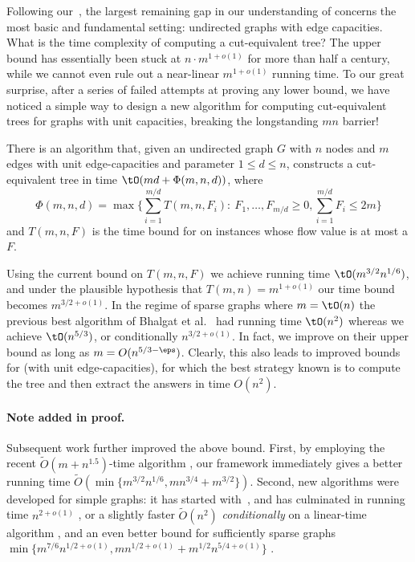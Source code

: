 \medskip

Following our~, the largest remaining gap in our understanding of \APMF concerns the most basic and fundamental setting: undirected graphs with edge capacities. What is the time complexity of computing a cut-equivalent tree? The upper bound has essentially been stuck at $n \cdot m^{1+o(1)}$ for more than half a century, while we cannot even rule out a near-linear $m^{1+o(1)}$ running time.
To our great surprise, after a series of failed attempts at proving any lower bound, we have noticed a simple way to design a new algorithm for computing cut-equivalent trees for graphs with unit capacities, breaking the longstanding $mn$ barrier!

\begin{theorem}\label{Theorem:Algorithm}
  There is an algorithm that, given an undirected graph $G$ with $n$ nodes and $m$ edges
%
with unit edge-capacities
and parameter $1\le d \le n$, constructs a cut-equivalent tree in time
%
  ${\tO}( md + \Phi(m,n,d) )$,      %
  where
  \[
    \Phi(m,n,d)=\max\Big\{\sum_{i=1}^{m/d} T(m,n,F_i):\ F_1,\dots,F_{m/d}\geq 0,\sum_{i=1}^{m/d} F_i\leq 2m \Big\}
  \]
  and $T(m,n,F)$ is the time bound for \MF on instances
%
whose
flow value is at most a $F$.
\end{theorem}


Using the current bound on $T(m,n,F)$ we achieve running time
%
  ${\tO}(m^{3/2}n^{1/6})$,       %
and under the plausible hypothesis that $T(m,n)=m^{1+o(1)}$
our time bound becomes $m^{3/2 + o(1)}$.
In the regime of sparse graphs where $m=\tO(n)$ the previous best algorithm of Bhalgat et al.~\cite{BHKP07} had running time
%
  ${\tO}(n^2)$      %
whereas we achieve $\tO(n^{5/3})$, or conditionally $n^{3/2+o(1)}$.
In fact, we improve on their upper bound as long as $m=O(n^{5/3-\eps})$.
Clearly, this also leads to improved bounds for \APMF (with unit edge-capacities), for which the best strategy known is to compute the tree
and then extract the answers in time $O(n^2)$.

\paragraph{Note added in proof.}
Subsequent work further improved the above bound.
First, by employing the recent $\widetilde{O}(m+n^{1.5})$-time \MF algorithm \cite{linearflow21},
our framework immediately gives a better running time $\widetilde{O}(\min\{m^{3/2}n^{1/6},mn^{3/4}+m^{3/2}\})$.
Second, new algorithms were developed for simple graphs:
it has started with~\cite{AKT21_stoc},
and has culminated in running time $n^{2+o(1)}$ \cite{AKT21_arxiv,LPS21},
or a slightly faster $\widetilde{O}(n^2)$ \emph{conditionally} on a linear-time \MF algorithm \cite{Zhang21},
and an even better bound for sufficiently sparse graphs
$\min \{ m^{7/6}n^{1/2+o(1)} , m n^{1/2+o(1)}+m^{1/2}n^{5/4+o(1)} \}$ \cite{LPS21}.

